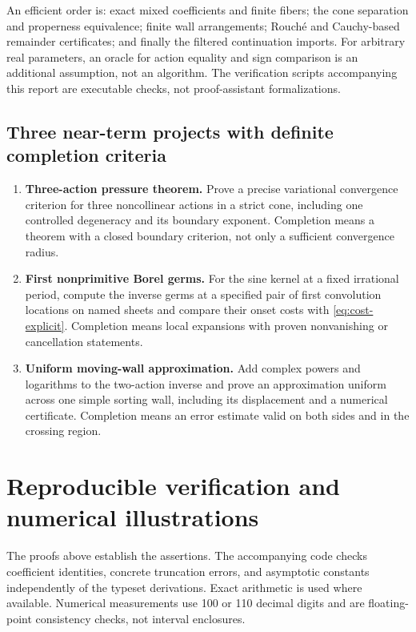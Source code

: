 \documentclass[11pt,a4paper]{article}
\numberwithin{equation}{section}
\theoremstyle{definition}
\theoremstyle{remark}
\begin{document}
An efficient order is: exact mixed coefficients and finite fibers;
the cone separation and properness equivalence; finite wall
arrangements; Rouch\'e and Cauchy-based remainder certificates;
and finally the filtered continuation imports.
For arbitrary real parameters, an oracle for action equality and
sign comparison is an additional assumption, not an algorithm.
The verification scripts accompanying this report are executable
checks, not proof-assistant formalizations.

\subsection{Three near-term projects with definite completion criteria}

\begin{enumerate}
\item \textbf{Three-action pressure theorem.}
Prove a precise variational convergence criterion for three
noncollinear actions in a strict cone, including one controlled
degeneracy and its boundary exponent.
Completion means a theorem with a closed boundary criterion,
not only a sufficient convergence radius.
\item \textbf{First nonprimitive Borel germs.}
For the sine kernel at a fixed irrational period, compute
the inverse germs at a specified pair of first convolution
locations on named sheets and compare their onset costs with
\eqref{eq:cost-explicit}.
Completion means local expansions with proven nonvanishing
or cancellation statements.
\item \textbf{Uniform moving-wall approximation.}
Add complex powers and logarithms to the two-action inverse
and prove an approximation uniform across one simple sorting
wall, including its displacement and a numerical certificate.
Completion means an error estimate valid on both sides and
in the crossing region.
\end{enumerate}

\section{Reproducible verification and numerical illustrations}\label{sec:verification}

The proofs above establish the assertions. The accompanying code
checks coefficient identities, concrete truncation errors, and
asymptotic constants independently of the typeset derivations.
Exact arithmetic is used where available. Numerical measurements
use 100 or 110 decimal digits and are floating-point consistency
checks, not interval enclosures.
\end{document}
